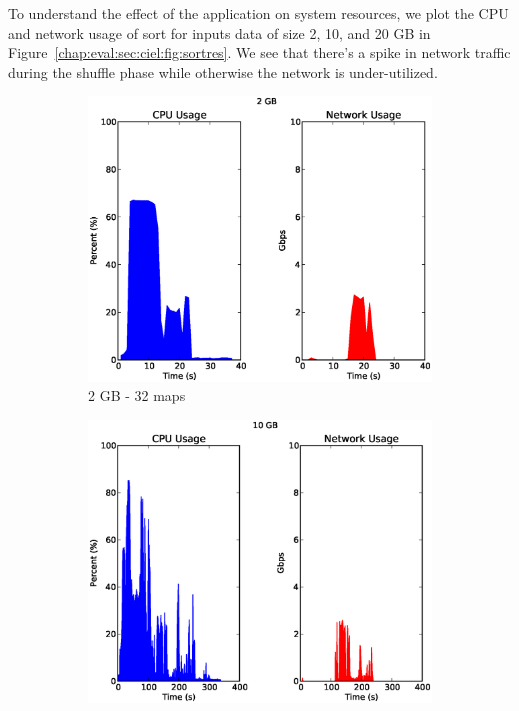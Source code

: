 \documentclass[a4paper,12pt,twoside,openright]{report}
\begin{document}
To understand the effect of the application on system resources, we plot the CPU
and network usage of sort for inputs data of size 2, 10, and 20 GB in
Figure~\ref{chap:eval:sec:ciel:fig:sortres}. We see that there's a spike in
network traffic during the shuffle phase while otherwise the network is
under-utilized.

\begin{figure}[h!]
        \begin{subfigure}[b]{0.33\textwidth}
                \centering
                \includegraphics[width=\textwidth]{32maps.csv.eps}
                \caption{2 GB - 32 maps}
                \label{fig:2GBsortres}
        \end{subfigure}%
        \begin{subfigure}[b]{0.33\textwidth}
                \centering
                \includegraphics[width=\textwidth]{160maps.csv.eps}

\end{subfigure}
\end{figure}
\end{document}
